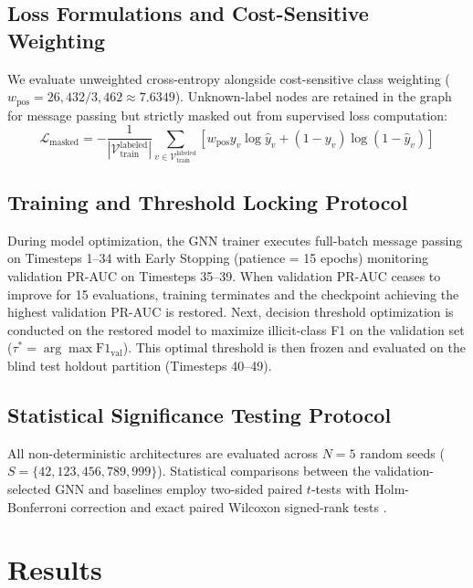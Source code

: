 \documentclass[conference]{IEEEtran}
\begin{document}
\subsection{Loss Formulations and Cost-Sensitive Weighting}
We evaluate unweighted cross-entropy alongside cost-sensitive class weighting ($w_{\text{pos}} = 26,432 / 3,462 \approx 7.6349$). Unknown-label nodes are retained in the graph for message passing but strictly masked out from supervised loss computation:
\begin{equation}
\mathcal{L}_{\text{masked}} = -\frac{1}{|\mathcal{V}_{\text{train}}^{\text{labeled}}|} \sum_{v \in \mathcal{V}_{\text{train}}^{\text{labeled}}} \left[ w_{\text{pos}} y_v \log \hat{y}_v + (1 - y_v) \log (1 - \hat{y}_v) \right]
\label{eq:loss}
\end{equation}

\subsection{Training and Threshold Locking Protocol}
During model optimization, the GNN trainer executes full-batch message passing on Timesteps 1--34 with Early Stopping (patience = 15 epochs) monitoring validation PR-AUC on Timesteps 35--39. When validation PR-AUC ceases to improve for 15 evaluations, training terminates and the checkpoint achieving the highest validation PR-AUC is restored. Next, decision threshold optimization is conducted on the restored model to maximize illicit-class F1 on the validation set ($\tau^* = \arg\max \text{F1}_{\text{val}}$). This optimal threshold is then frozen and evaluated on the blind test holdout partition (Timesteps 40--49).

\subsection{Statistical Significance Testing Protocol}
All non-deterministic architectures are evaluated across $N = 5$ random seeds ($S = \{42, 123, 456, 789, 999\}$). Statistical comparisons between the validation-selected GNN and baselines employ two-sided paired $t$-tests with Holm-Bonferroni correction \cite{holm1979simple} and exact paired Wilcoxon signed-rank tests \cite{wilcoxon1945individual, demsar2006statistical}.

\section{Results}
\end{document}
